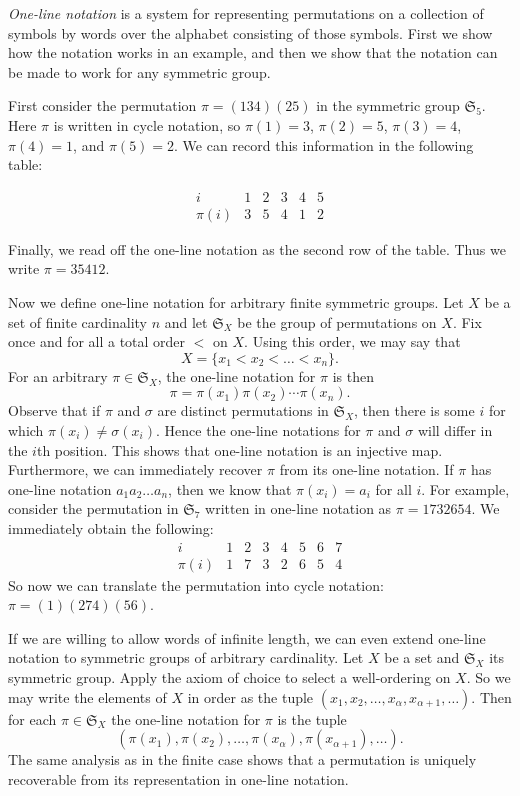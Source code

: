 \documentclass[12pt]{article}
\begin{document}

\emph{One-line notation} is a system for representing permutations on a collection of symbols by words over the alphabet consisting of those symbols.  First we show how the notation works in an example, and then we show that the notation can be made to work for any symmetric group.

First consider the permutation $\pi = (134)(25)$ in the symmetric group $\mathfrak{S}_5$.  Here $\pi$ is written in cycle notation, so $\pi(1)=3$, $\pi(2)=5$, $\pi(3)=4$, $\pi(4)=1$, and $\pi(5)=2$.  We can record this information in the following table:

\[\begin{array}{clllll}
i      & 1 & 2 & 3 & 4 & 5 \\
\pi(i) & 3 & 5 & 4 & 1 & 2 
\end{array}\]

Finally, we read off the one-line notation as the second row of the table.  Thus we write $\pi = 35412$.

Now we define one-line notation for arbitrary finite symmetric groups.  Let $X$ be a set of finite cardinality $n$ and let $\mathfrak{S}_X$ be the group of permutations on $X$.  Fix once and for all a total order $<$ on $X$.  Using this order, we may say that 
\[
X=\{ x_1 < x_2 < \dots < x_n \}.
\]
For an arbitrary $\pi\in\mathfrak{S}_X$, the one-line notation for $\pi$ is then
\[
\pi = \pi(x_1) \pi(x_2) \cdots \pi(x_n).
\]
Observe that if $\pi$ and $\sigma$ are distinct permutations in $\mathfrak{S}_X$, then there is some $i$ for which $\pi(x_i)\ne\sigma(x_i)$.  Hence the one-line notations for $\pi$ and $\sigma$ will differ in the $i$th position.  This shows that one-line notation is an injective map.  
Furthermore, we can immediately recover $\pi$ from its one-line notation.  If $\pi$ has one-line notation $a_1 a_2 \dots a_n$, then we know that $\pi(x_i) = a_i$ for all $i$.  For example, consider the permutation in $\mathfrak{S}_7$ written in one-line notation as $\pi=1732654$.  We immediately obtain the following:
\[\begin{array}{clllllll}
i      & 1 & 2 & 3 & 4 & 5 & 6 & 7\\
\pi(i) & 1 & 7 & 3 & 2 & 6 & 5 & 4
\end{array}\]
So now we can translate the permutation into cycle notation: $\pi=(1)(274)(56)$. 

If we are willing to allow words of infinite length, we can even extend one-line notation to symmetric groups of arbitrary cardinality.  Let $X$ be a set and $\mathfrak{S}_X$ its symmetric group.  Apply the axiom of choice to select a well-ordering on $X$.  So we may write the elements of $X$ in order as the tuple $(x_1, x_2, \dots, x_{\alpha}, x_{\alpha+1}, \dots)$.  Then for each $\pi\in\mathfrak{S}_X$ the one-line notation for $\pi$ is the tuple
\[
(\pi(x_1), \pi(x_2), \dots, \pi(x_{\alpha}), \pi(x_{\alpha+1}), \dots).
\]
The same analysis as in the finite case shows that a permutation is uniquely recoverable from its representation in one-line notation.
\end{document}
